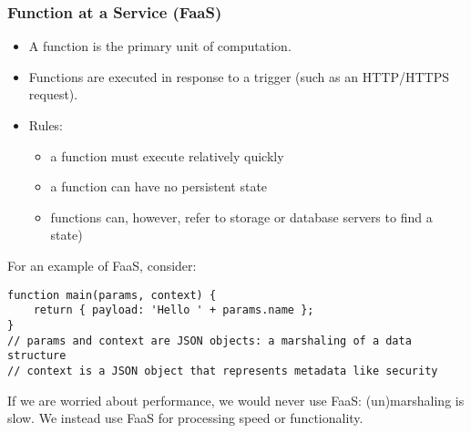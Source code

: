 \documentclass[../../lecture_notes.tex]{subfiles}
\begin{document}
\subsubsection*{Function at a Service (FaaS)}
\begin{itemize}
\item A function is the primary unit of computation.
\item Functions are executed in response to a trigger (such as an HTTP/HTTPS request).
\item Rules:
	\begin{itemize}
		\item a function must execute relatively quickly
		\item a function can have no persistent state
		\item functions can, however, refer to storage or database servers to find a state)
	\end{itemize}
\end{itemize}

For an example of FaaS, consider:
\begin{lstlisting}
function main(params, context) {
	return { payload: 'Hello ' + params.name };
}
// params and context are JSON objects: a marshaling of a data structure
// context is a JSON object that represents metadata like security
\end{lstlisting}

If we are worried about performance, we would never use FaaS: (un)marshaling is slow. We instead use FaaS for processing speed or functionality.
\end{document}
